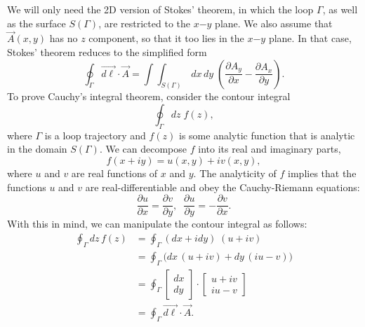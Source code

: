 \documentclass[10pt,a4paper]{article}
\begin{document}
We will only need the 2D version of Stokes' theorem, in which the loop
$\Gamma$, as well as the surface $S(\Gamma)$, are restricted to the
$x\mathrm{-}y$ plane. We also assume that $\vec{A}(x,y)$ has no
$z$ component, so that it too lies in the $x\mathrm{-}y$ plane. In
that case, Stokes' theorem reduces to the simplified form
\begin{equation}
\oint_\Gamma \vec{d\ell} \cdot \vec{A} = \int\!\!\int_{S(\Gamma)}\, dx \,dy \; \left(\frac{\partial A_y}{\partial x} - \frac{\partial A_x}{\partial y}\right).
\end{equation}
To prove Cauchy's integral theorem, consider the contour integral
\begin{equation}
\oint_\Gamma dz \; f(z),
\end{equation}
where $\Gamma$ is a loop trajectory and $f(z)$ is some analytic
function that is analytic in the domain $S(\Gamma)$. We can decompose
$f$ into its real and imaginary parts,
\begin{equation}
f(x+iy) = u(x,y) + iv(x,y),
\end{equation}
where $u$ and $v$ are real functions of $x$ and $y$. The analyticity
of $f$ implies that the functions $u$ and $v$ are real-differentiable
and obey the Cauchy-Riemann equations:
\begin{equation}
\frac{\partial u}{\partial x} = \frac{\partial v}{\partial y},\;\; \frac{\partial u}{\partial y} = -\frac{\partial v}{\partial x}.
\end{equation}
With this in mind, we can manipulate the contour integral as follows:
\begin{align}\oint_\Gamma dz \, f(z) &= \oint_\Gamma \left(dx + i dy\right) \; \left(u + i v\right) \\
&= \oint_\Gamma \Bigg(dx\, (u+iv) + dy\, (iu - v) \Bigg)  \\
&= \oint_\Gamma \begin{bmatrix}dx\\dy\end{bmatrix} \cdot \begin{bmatrix}u + i v \\ iu - v\end{bmatrix}\\
      &= \oint_\Gamma \vec{d\ell} \cdot \vec{A}.
\end{align}
\end{document}
